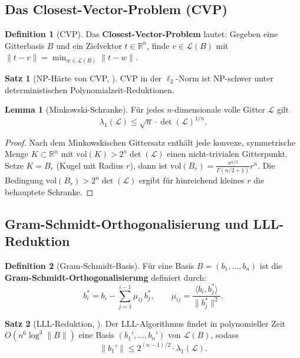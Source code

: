﻿\documentclass[a4paper,12pt]{article}
\theoremstyle{definition}
\newtheorem{definition}{Definition}[section]
\newtheorem{satz}{Satz}[section]
\newtheorem{lemma}{Lemma}[section]
\begin{document}
\subsection{Das Closest-Vector-Problem (CVP)}

\begin{definition}[CVP]
Das \textbf{Closest-Vector-Problem} lautet: Gegeben eine Gitterbasis $B$ und
ein Zielvektor $t \in \mathbb{R}^n$, finde $v \in \mathcal{L}(B)$ mit
$\|t - v\| = \min_{w \in \mathcal{L}(B)} \|t - w\|$.
\end{definition}

\begin{satz}[NP-Härte von CVP, \cite{MG02}]
CVP in der $\ell_2$-Norm ist NP-schwer unter deterministischen Polynomialzeit-Reduktionen.
\end{satz}

\begin{lemma}[Minkowski-Schranke]
\label{lem:mink}
Für jedes $n$-dimensionale volle Gitter $\mathcal{L}$ gilt
\[
  \lambda_1(\mathcal{L}) \leq \sqrt{n} \cdot \det(\mathcal{L})^{1/n}.
\]
\end{lemma}

\begin{proof}
Nach dem Minkowskischen Gittersatz enthält jede konvexe, symmetrische Menge
$K \subset \mathbb{R}^n$ mit $\mathrm{vol}(K) > 2^n \det(\mathcal{L})$ einen
nicht-trivialen Gitterpunkt. Setze $K = B_r$ (Kugel mit Radius $r$),
dann ist $\mathrm{vol}(B_r) = \frac{\pi^{n/2}}{\Gamma(n/2+1)} r^n$.
Die Bedingung $\mathrm{vol}(B_r) > 2^n \det(\mathcal{L})$ ergibt für hinreichend
kleines $r$ die behauptete Schranke.
\end{proof}

\subsection{Gram-Schmidt-Orthogonalisierung und LLL-Reduktion}

\begin{definition}[Gram-Schmidt-Basis]
Für eine Basis $B = (b_1, \ldots, b_n)$ ist die
\textbf{Gram-Schmidt-Orthogonalisierung} definiert durch:
\[
  b_i^* = b_i - \sum_{j=1}^{i-1} \mu_{ij} \, b_j^*, \qquad
  \mu_{ij} = \frac{\langle b_i, b_j^* \rangle}{\|b_j^*\|^2}.
\]
\end{definition}

\begin{satz}[LLL-Reduktion, \cite{LLL82}]
Der LLL-Algorithmus findet in polynomieller Zeit $O(n^6 \log^3 \|B\|)$
eine Basis $(b_1', \ldots, b_n')$ von $\mathcal{L}(B)$, sodass
\[
  \|b_1'\| \leq 2^{(n-1)/2} \cdot \lambda_1(\mathcal{L}).
\]
\end{satz}
\end{document}
